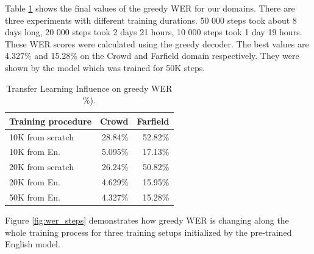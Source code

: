 \documentclass[a4paper]{article}
\begin{document}
Table \ref{tab:wer_50k} shows the final values of the greedy WER for our domains. There are three experiments with different training durations. 50 000 steps took about 8 days long, 20 000 steps took 2 days 21 hours, 10 000 steps took 1 day 19 hours. These WER scores were calculated using the greedy decoder. The best values are 4.327\% and 15.28\% on the Crowd and Farfield domain respectively. They were shown by the model which was trained for 50K steps.  

\begin{table}[t]
  \caption{Transfer Learning Influence on greedy WER \%).}
  \label{tab:wer_50k}
  \centering
  \begin{tabular}{lrr}
    \toprule
    \textbf{Training procedure } & \textbf{Crowd} & \textbf{Farfield} \\
    \midrule
    10K from scratch   &  28.84\%   & 52.82\% \\
    10K from En.    & 5.095\%       & 17.13\%  \\
    \midrule
    20K from scratch   &  26.24\%   & 50.82\% \\
    20K from En.    & 4.629\%       & 15.95\% \\
    \midrule
    50K from En.    & 4.327\%       & 15.28\% \\
    \bottomrule
  \end{tabular}
\end{table}


Figure \ref{fig:wer_steps} demonstrates how greedy WER is changing along the whole training process for three training setups initialized by the pre-trained English model.  
\end{document}
